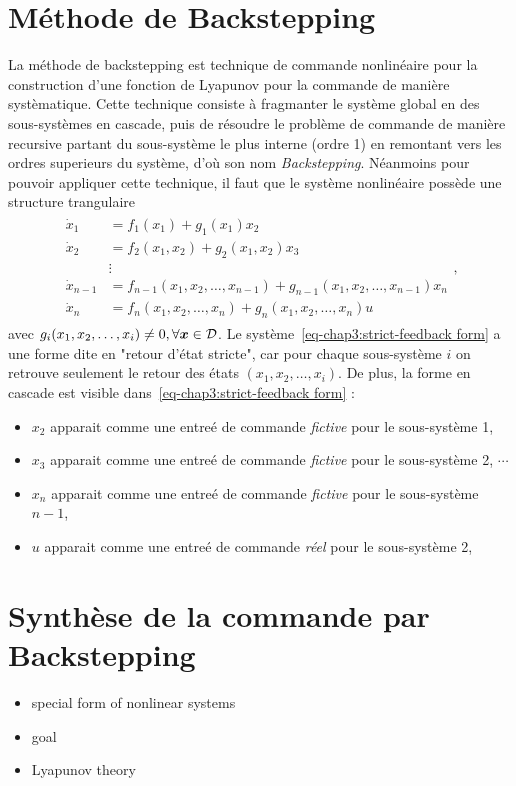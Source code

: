 \section{Méthode de Backstepping}
La méthode de backstepping est technique de commande nonlinéaire pour la construction d'une fonction de Lyapunov pour la commande de manière systèmatique. Cette technique consiste à fragmanter le système  global en des sous-systèmes en cascade, puis de résoudre le problème de commande de manière recursive partant du sous-système le plus interne (ordre 1) en remontant vers les ordres superieurs du système, d'où son nom \emph{Backstepping}. Néanmoins pour pouvoir appliquer cette technique, il faut que  le système nonlinéaire possède une structure trangulaire
\begin{align}\label{eq-chap3:strict-feedback form}
	\begin{split}
		\dot{x}_1 &= f_1(x_1) + g_1(x_1)x_2\\
		\dot{x}_2 &= f_2(x_1,x_2) + g_2(x_1,x_2)x_3\\
		&\vdots \\
		\dot{x}_{n-1} &= f_{n-1}(x_1,x_2,\ldots,x_{n-1}) +  g_{n-1}(x_1,x_2,\ldots,x_{n-1})x_n\\
		\dot{x}_n &= f_{n}(x_1,x_2,\ldots,x_{n}) +  g_{n}(x_1,x_2,\ldots,x_{n})u
	\end{split},
\end{align} 
avec $g_i(x_1,x_2,\ldots,x_i)\neq0, \forall \bm{x}\in{\cal D}$. Le système~\eqref{eq-chap3:strict-feedback form} a une forme dite en "retour d'état stricte", car pour chaque sous-système $i$ on retrouve seulement le retour des états $(x_1,x_2,\ldots,x_i)$. De plus,  la forme en cascade est visible dans~\eqref{eq-chap3:strict-feedback form} : 
\begin{itemize}
	\item $x_2$ apparait comme une entreé de commande \emph{fictive} pour le sous-système 1,
	\item $x_3$ apparait comme une entreé de commande \emph{fictive} pour le sous-système 2, $\cdots$
	\item  $x_n$ apparait comme une entreé de commande \emph{fictive} pour le sous-système $n-1$, 
	\item  $u$ apparait comme une entreé de commande \emph{réel} pour le sous-système 2,
\end{itemize}
\section{Synthèse de la commande par Backstepping}

\begin{itemize}
	\item special form of nonlinear systems
	\item goal
	\item Lyapunov theory
	
\end{itemize}